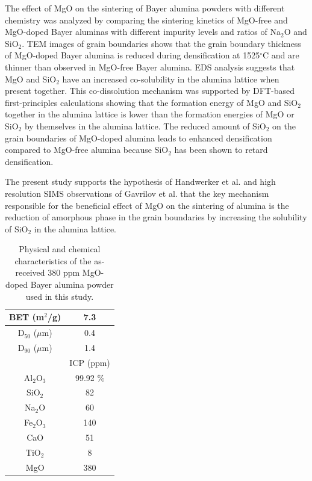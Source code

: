 The effect of MgO on the sintering of Bayer alumina powders with different chemistry was analyzed by comparing the sintering kinetics of MgO-free and MgO-doped Bayer aluminas with different impurity levels and ratios of Na$_{2}$O and SiO$_{2}$. TEM images of grain boundaries shows that the grain boundary thickness of MgO-doped Bayer alumina is reduced during densification at 1525$^{\circ}$C and are thinner than observed in MgO-free Bayer alumina. EDS analysis suggests that MgO and SiO$_{2}$ have an increased co-solubility in the alumina lattice when present together. This co-dissolution mechanism was supported by DFT-based first-principles calculations showing that the formation energy of MgO and SiO$_{2}$ together in the alumina lattice is lower than the formation energies of MgO or SiO$_{2}$ by themselves in the alumina lattice. The reduced amount of SiO$_{2}$ on the grain boundaries of MgO-doped alumina leads to enhanced densification compared to MgO-free alumina because SiO$_{2}$ has been shown to retard densification.

The present study supports the hypothesis of Handwerker et al. \cite{Handwerker1989} and high resolution SIMS observations of Gavrilov et al. \cite{Gavrilov1999} that the key mechanism responsible for the beneficial effect of MgO on the sintering of alumina is the reduction of amorphous phase in the grain boundaries by increasing the solubility of SiO$_{2}$ in the alumina lattice.


\newpage
\begin{table}[H]
	\caption{Physical and chemical characteristics of the as-received 380 ppm MgO-doped Bayer alumina powder used in this study.}
	\centering
	\begin{tabular}{ | c | c | }
			\hline
			BET (m$^{2}$/g) & 7.3 \\
			\hline
			D$_{50}$ ($\mu$m) & 0.4 \\
			\hline
			D$_{90}$ ($\mu$m) & 1.4 \\
			\hline
			 & ICP (ppm) \\
			\hline
			Al$_{2}$O$_{3}$ & 99.92 \% \\
			\hline
			SiO$_{2}$ & 82 \\
			\hline
			Na$_{2}$O & 60 \\
			\hline
			Fe$_{2}$O$_{3}$ & 140 \\
			\hline
			CaO & 51 \\
			\hline
			TiO$_{2}$ & 8 \\
			\hline
			MgO & 380 \\
			\hline
	\end{tabular}
	\label{Ch3-table:table1}
\end{table}
\clearpage

